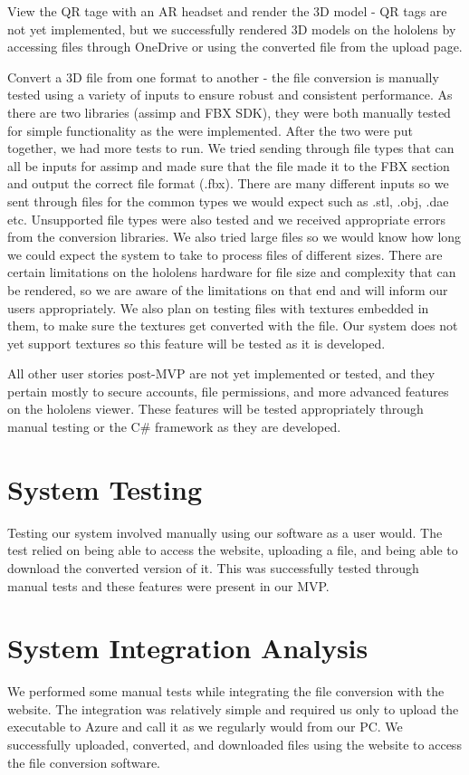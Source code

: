 View the QR tage with an AR headset and render the 3D model - QR tags are not yet implemented, but we successfully rendered 3D models on the hololens by accessing files through OneDrive or using the converted file from the upload page.

Convert a 3D file from one format to another - the file conversion is manually tested using a variety of inputs to ensure robust and consistent performance. As there are two libraries (assimp and FBX SDK), they were both manually tested for simple functionality as the were implemented. After the two were put together, we had more tests to run. We tried sending through file types that can all be inputs for assimp and made sure that the file made it to the FBX section and output the correct file format (.fbx). There are many different inputs so we sent through files for the common types we would expect such as .stl, .obj, .dae etc. Unsupported file types were also tested and we received appropriate errors from the conversion libraries. We also tried large files so we would know how long we could expect the system to take to process files of different sizes. There are certain limitations on the hololens hardware for file size and complexity that can be rendered, so we are aware of the limitations on that end and will inform our users appropriately. We also plan on testing files with textures embedded in them, to make sure the textures get converted with the file. Our system does not yet support textures so this feature will be tested as it is developed. 

All other user stories post-MVP are not yet implemented or tested, and they pertain mostly to secure accounts, file permissions, and more advanced features on the hololens viewer. 
These features will be tested appropriately through manual testing or the C\# framework as they are developed.

\section{System Testing}
Testing our system involved manually using our software as a user would.
The test relied on being able to access the website, uploading a file, and being able to download the converted version of it.
This was successfully tested through manual tests and these features were present in our MVP.

\section{System Integration Analysis}
We performed some manual tests while integrating the file conversion with the website.
The integration was relatively simple and required us only to upload the executable to Azure and call it as we regularly would from our PC.
We successfully uploaded, converted, and downloaded files using the website to access the file conversion software.

